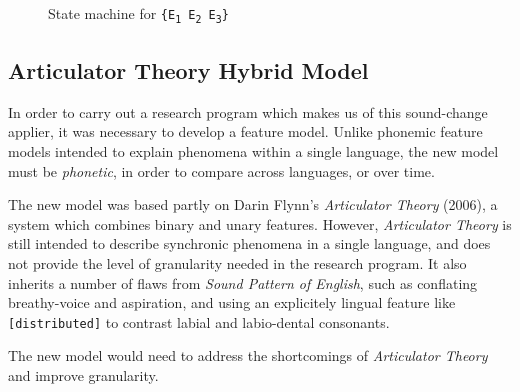 \documentclass[10pt,letterpaper]{article}
\begin{document}
%
%
%

\begin{figure}\label{fig:machine_set}
\caption{State machine for \texttt{\{E\textsubscript{1} E\textsubscript{2} E\textsubscript{3}\}}}
\centering
{}
\end{figure}

\subsection{Articulator Theory Hybrid Model}
\label{sub:ATHM}
In order to carry out a research program which makes us of this sound-change applier, it was necessary to develop a feature model. Unlike phonemic feature models intended to explain phenomena within a single language, the new model must be \emph{phonetic}, in order to compare across languages, or over time.

The new model was based partly on Darin Flynn's \emph{Articulator Theory} (2006), a system which combines binary and unary features. However, \emph{Articulator Theory} is still intended to describe synchronic phenomena in a single language, and does not provide the level of granularity needed in the research program. It also inherits a number of flaws from \emph{Sound Pattern of English}, such as conflating breathy-voice and aspiration, and using an explicitely lingual feature like \texttt{[distributed]} to contrast labial and labio-dental consonants.

The new model would need to address the shortcomings of \emph{Articulator Theory} and improve granularity.
\end{document}
